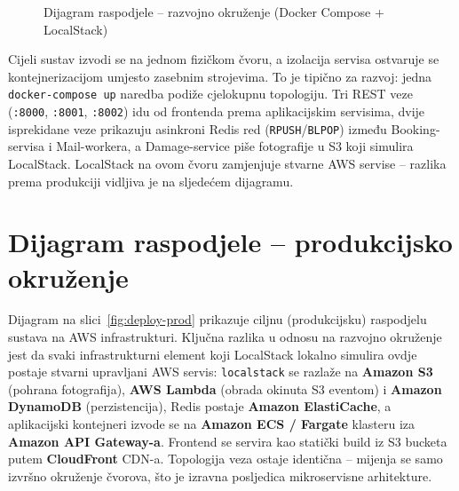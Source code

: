 \documentclass[12pt,a4paper]{article}
\begin{document}
\begin{figure}[H]
{
}%
\caption{Dijagram raspodjele -- razvojno okruženje (Docker Compose + LocalStack)}
\label{fig:deploy-dev}
\end{figure}

Cijeli sustav izvodi se na jednom fizičkom čvoru, a izolacija servisa ostvaruje se kontejnerizacijom umjesto zasebnim strojevima. To je tipično za razvoj: jedna \texttt{docker-compose up} naredba podiže cjelokupnu topologiju. Tri REST veze (\texttt{:8000}, \texttt{:8001}, \texttt{:8002}) idu od frontenda prema aplikacijskim servisima, dvije isprekidane veze prikazuju asinkroni Redis red (\texttt{RPUSH}/\texttt{BLPOP}) između Booking-servisa i Mail-workera, a Damage-service piše fotografije u S3 koji simulira LocalStack. LocalStack na ovom čvoru zamjenjuje stvarne AWS servise -- razlika prema produkciji vidljiva je na sljedećem dijagramu.

\section{Dijagram raspodjele -- produkcijsko okruženje}

Dijagram na slici~\ref{fig:deploy-prod} prikazuje ciljnu (produkcijsku) raspodjelu sustava na AWS infrastrukturi. Ključna razlika u odnosu na razvojno okruženje jest da svaki infrastrukturni element koji LocalStack lokalno simulira ovdje postaje stvarni upravljani AWS servis: \texttt{localstack} se razlaže na \textbf{Amazon S3} (pohrana fotografija), \textbf{AWS Lambda} (obrada okinuta S3 eventom) i \textbf{Amazon DynamoDB} (perzistencija), Redis postaje \textbf{Amazon ElastiCache}, a aplikacijski kontejneri izvode se na \textbf{Amazon ECS / Fargate} klasteru iza \textbf{Amazon API Gateway-a}. Frontend se servira kao statički build iz S3 bucketa putem \textbf{CloudFront} CDN-a. Topologija veza ostaje identična -- mijenja se samo izvršno okruženje čvorova, što je izravna posljedica mikroservisne arhitekture.
\end{document}
